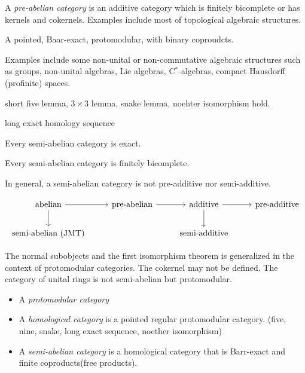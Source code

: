 \documentclass{../../large}
\begin{document}
\begin{prb}
A \emph{pre-abelian category} is an additive category which is finitely bicomplete or has kernels and cokernels.
Examples include most of topological algebraic structures.
\begin{parts}
\item 
\end{parts}
\end{prb}

\begin{prb}
A pointed, Baar-exact, protomodular, with binary coproudcts.

Examples include some non-unital or non-commutative algebraic structures such as groups, non-unital algebras, Lie algebras, C$^*$-algebras, compact Hausdorff (profinite) spaces.
\begin{parts}
\item short five lemma, $3\times3$ lemma, snake lemma, noehter isomorphism hold.
\item long exact homology sequence
\item Every semi-abelian category is exact.
\item Every semi-abelian category is finitely bicomplete.
\item In general, a semi-abelian category is not pre-additive nor semi-additive.
\end{parts}
\end{prb}



\[\begin{tikzcd}[math mode=false]
abelian\ar{r}\ar{d} & pre-abelian \ar{r} & additive \ar{r}\ar{d} & pre-additive\\
semi-abelian (JMT) && semi-additive & \,
\end{tikzcd}\]



\begin{prb}
The normal subobjects and the first isomorphism theorem is generalized in the context of protomodular categories.
The cokernel may not be defined.
The category of unital rings is not semi-abelian but protomodular.
\begin{itemize}
\item A \emph{protomodular category}
\item A \emph{homological category} is a pointed regular protomodular category. (five, nine, snake, long exact sequence, noether isomorphism)
\item A \emph{semi-abelian category} is a homological category that is Barr-exact and finite coproducts(free products).
\end{itemize}
\end{prb}
\end{document}
